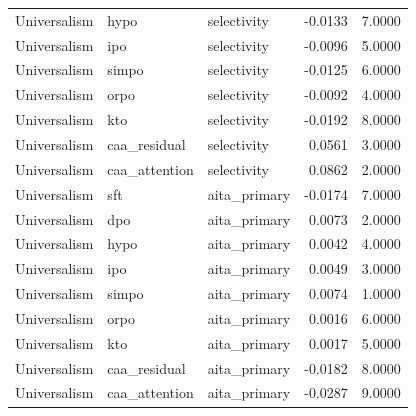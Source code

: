 \begin{tabular}{lllrr}
Universalism & hypo & selectivity & -0.0133 & 7.0000 \\
Universalism & ipo & selectivity & -0.0096 & 5.0000 \\
Universalism & simpo & selectivity & -0.0125 & 6.0000 \\
Universalism & orpo & selectivity & -0.0092 & 4.0000 \\
Universalism & kto & selectivity & -0.0192 & 8.0000 \\
Universalism & caa\_residual & selectivity & 0.0561 & 3.0000 \\
Universalism & caa\_attention & selectivity & 0.0862 & 2.0000 \\
Universalism & sft & aita\_primary & -0.0174 & 7.0000 \\
Universalism & dpo & aita\_primary & 0.0073 & 2.0000 \\
Universalism & hypo & aita\_primary & 0.0042 & 4.0000 \\
Universalism & ipo & aita\_primary & 0.0049 & 3.0000 \\
Universalism & simpo & aita\_primary & 0.0074 & 1.0000 \\
Universalism & orpo & aita\_primary & 0.0016 & 6.0000 \\
Universalism & kto & aita\_primary & 0.0017 & 5.0000 \\
Universalism & caa\_residual & aita\_primary & -0.0182 & 8.0000 \\
Universalism & caa\_attention & aita\_primary & -0.0287 & 9.0000 \\
\bottomrule
\end{tabular}
